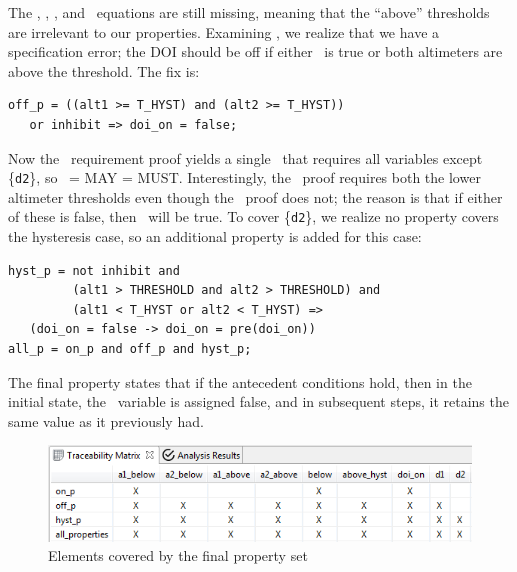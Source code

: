 The \abovehyst, \aoneabove, \atwoabove, and \dtwo\ equations are still missing, meaning that the ``above'' thresholds are irrelevant to our properties.  Examining \offp, we realize that we have a specification error; the DOI should be off if either \inhibit\ is true or both altimeters are above the threshold. The fix is:

{\smaller
\begin{verbatim}
off_p = ((alt1 >= T_HYST) and (alt2 >= T_HYST))
   or inhibit => doi_on = false;
\end{verbatim}
}

\noindent Now the \allp\ requirement proof yields a single \mivc ~that requires all variables except \{\texttt{d2}\}, so \mivc ~= MAY = MUST.  Interestingly, the \offp\ proof requires both the lower altimeter thresholds even though the \onp\ proof does not; the reason is that if either of these is false, then \doion\ will be true.  To cover \{\texttt{d2}\}, we realize no property covers the hysteresis case, so an additional property is added for this case:

{\smaller
\begin{verbatim}
hyst_p = not inhibit and
         (alt1 > THRESHOLD and alt2 > THRESHOLD) and
         (alt1 < T_HYST or alt2 < T_HYST) =>
   (doi_on = false -> doi_on = pre(doi_on))
all_p = on_p and off_p and hyst_p;
\end{verbatim}
}
\noindent The final property states that if the antecedent conditions hold, then in the initial state, the \doion\ variable is assigned false, and in subsequent steps, it retains the same value as it previously had.  

\begin{figure}
  \centering
  \includegraphics[width=\columnwidth]{figs/spear_set4.png}
  \vspace{-0.1in}
  \caption{Elements covered by the final property set}
  \label{fig:propertyset4}
\end{figure}

